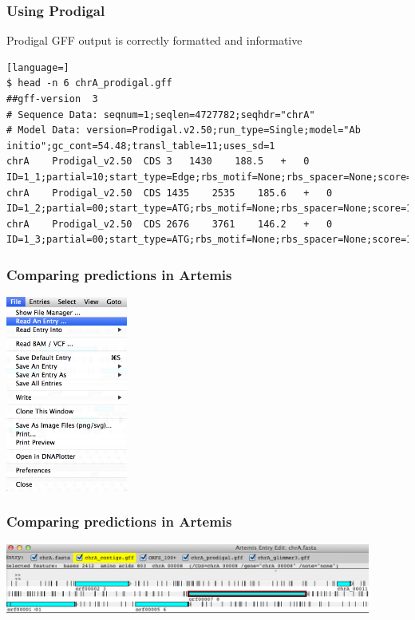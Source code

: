 \documentclass[table]{beamer}
\begin{document}
\begin{frame}[fragile]
\frametitle{Using Prodigal}
Prodigal GFF output is correctly formatted and informative
\begin{lstlisting}[language=]
$ head -n 6 chrA_prodigal.gff 
##gff-version  3
# Sequence Data: seqnum=1;seqlen=4727782;seqhdr="chrA"
# Model Data: version=Prodigal.v2.50;run_type=Single;model="Ab initio";gc_cont=54.48;transl_table=11;uses_sd=1
chrA	Prodigal_v2.50	CDS	3	1430	188.5	+	0	ID=1_1;partial=10;start_type=Edge;rbs_motif=None;rbs_spacer=None;score=188.54;cscore=185.37;sscore=3.18;rscore=0.00;uscore=3.18;tscore=0.00
chrA	Prodigal_v2.50	CDS	1435	2535	185.6	+	0	ID=1_2;partial=00;start_type=ATG;rbs_motif=None;rbs_spacer=None;score=185.61;cscore=184.24;sscore=1.36;rscore=-7.73;uscore=3.48;tscore=4.37
chrA	Prodigal_v2.50	CDS	2676	3761	146.2	+	0	ID=1_3;partial=00;start_type=ATG;rbs_motif=None;rbs_spacer=None;score=146.19;cscore=149.82;sscore=-3.63;rscore=-7.73;uscore=-0.28;tscore=4.37
\end{lstlisting}
\end{frame}

    \begin{frame}
     \frametitle{Comparing predictions in Artemis}
      \begin{center}
        \includegraphics[width=0.3\textwidth]{images/artemis_cdspred0}     
      \end{center}
    \end{frame}

    \begin{frame}
     \frametitle{Comparing predictions in Artemis}
      \begin{center}
        \includegraphics[width=0.9\textwidth]{images/artemis_cdspred1}     
      \end{center}
    \end{frame}
\end{document}
